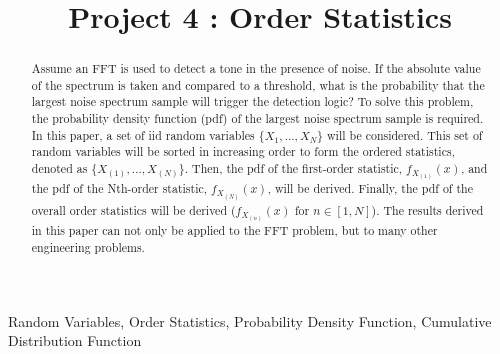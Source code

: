\documentclass[conference]{IEEEtran}
\begin{document}
\title{Project 4 : Order Statistics}

\author{
}
\maketitle

\begin{abstract}
Assume an FFT is used to detect a tone in the presence of noise. If the absolute value of the spectrum is taken and compared to a threshold, what is the probability that the largest noise spectrum sample will trigger the detection logic? To solve this problem, the probability density function (pdf) of the largest noise spectrum sample is required. In this paper, a set of iid random variables $\{X_1,...,X_N\}$ will be considered. %
This set of random variables will be sorted in increasing order to form the ordered statistics, denoted as $\{X_{(1)},...,X_{(N)}\}$. Then, the pdf of the first-order statistic, $f_{X_{(1)}}(x)$, and the pdf of the Nth-order statistic, $f_{X_{(N)}}(x)$, will be derived. Finally, the pdf of the overall order statistics will be derived ($f_{X_{(n)}}(x)$ for $n\in [1, N]$). The results derived in this paper can not only be applied to the FFT problem, but to many other engineering problems.
\end{abstract}

\begin{IEEEkeywords}
Random Variables, Order Statistics, Probability Density Function, Cumulative Distribution Function
\end{IEEEkeywords}
\end{document}
